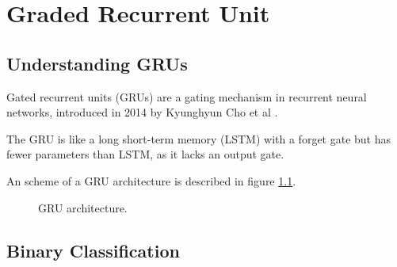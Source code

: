 
\chapter{Graded Recurrent Unit} %

\label{Chapter5} %


\section{Understanding GRUs}

Gated recurrent units (GRUs) are a gating mechanism in recurrent neural networks, introduced in 2014 by Kyunghyun Cho et al .

The GRU is like a long short-term memory (LSTM) with a forget gate but has fewer parameters than LSTM, as it lacks an output gate.

An scheme of a GRU architecture is described in figure \ref{fig:gru}.

\begin{figure}
\begin{center}
\end{center}
\decoRule
\caption[GRU architecture]{GRU architecture.}
\label{fig:gru}
\end{figure}

\section{Binary Classification}


